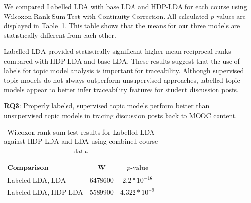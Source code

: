 \documentclass[sigconf, anonymous]{acmart}
\begin{document}
We compared Labelled LDA with base LDA and HDP-LDA for each course using Wilcoxon Rank Sum Test with Continuity Correction.
All calculated $p$-values are displayed in Table~\ref{tab:sup-unsup-test}.
This table shows that the means for our three models are statistically different from each other.

Labelled LDA provided statistically significant higher mean reciprocal ranks compared with HDP-LDA and base LDA.
These results suggest that the use of labels for topic model analysis is important for traceability.
Although supervised topic models do not always outperform unsupervised approaches, labelled topic models appear to better infer traceability features for student discussion posts.

\begin{tcolorbox}[sharp corners, top=1mm, bottom=1mm]
\textbf{RQ3}: Properly labeled, supervised topic models perform better than unsupervised topic models in tracing discussion posts back to MOOC content.
\end{tcolorbox}

\begin{table}
    \centering
    \begin{tabular}{l*{2}{c}}
    \toprule
    Comparison & W & $p\text{-value}$ \\
    \midrule
    Labeled LDA, LDA & 6478600 & $2.2*10^{-16}$ \\
    Labeled LDA, HDP-LDA & 5589900 & $4.322*10^{-9}$ \\
    \bottomrule
    \end{tabular}
    \caption{Wilcoxon rank sum test results for Labelled LDA against HDP-LDA and LDA using combined course data.}
    \label{tab:sup-unsup-test}
\end{table}
\end{document}

